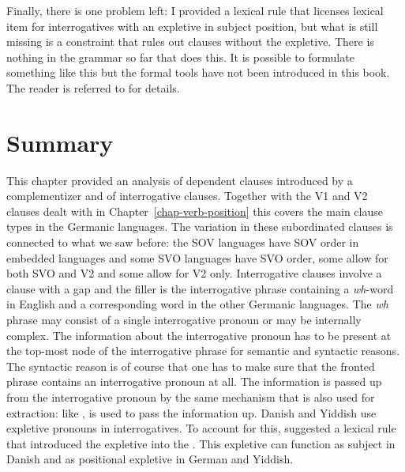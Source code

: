 Finally, there is one problem left: I provided a lexical rule that licenses lexical item for interrogatives with an expletive
in subject position, but what is still missing is a constraint that rules out clauses without the
expletive. There is nothing in the grammar so far that does this. It is possible to formulate
something like this but the formal tools have not been introduced in this book. The reader is
referred to  for details.



\section{Summary}

This chapter provided an analysis of dependent clauses introduced by a complementizer and of
interrogative clauses. Together with the V1 and V2 clauses dealt with in Chapter~\ref{chap-verb-position} this covers
the main clause types in the Germanic languages. The variation in these subordinated clauses is
connected to what we saw before: the SOV languages have SOV order in embedded languages and some SVO
languages have SVO order, some allow for both SVO and V2 and some allow for V2 only. Interrogative
clauses involve a clause with a gap and the filler is the interrogative phrase containing a
\emph{wh}-word in English and a corresponding word in the other Germanic languages. The \emph{wh}
phrase may consist of a single interrogative pronoun or may be internally complex. The information
about the interrogative pronoun has to be present at the top-most node of the interrogative phrase
for semantic and syntactic reasons. The syntactic reason is of course that one has to make sure that
the fronted phrase contains an interrogative pronoun at all. The information is passed up from the
interrogative pronoun by the same mechanism that is also used for extraction: like \slasch, \que is used
to pass the information up. Danish and Yiddish use expletive pronouns in interrogatives. To
account for this,  suggested a lexical rule that introduced the expletive into the
\argstl. This expletive can function as subject in Danish and as positional expletive in German and
Yiddish.





